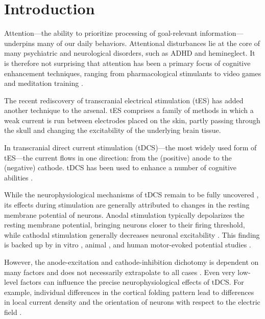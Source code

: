 \documentclass[11pt,english,]{memoir}
\begin{document}
\hypertarget{tDCS_att_review-introduction}{%
\section{Introduction}\label{tDCS_att_review-introduction}}

Attention---the ability to prioritize processing of goal-relevant information---underpins many of our daily behaviors. Attentional disturbances lie at the core of many psychiatric and neurological disorders, such as ADHD and hemineglect. It is therefore not surprising that attention has been a primary focus of cognitive enhancement techniques, ranging from pharmacological stimulants \autocite{Koelega1993} to video games \autocite{Green2012} and meditation training \autocite{Lutz2008}.

The recent rediscovery of transcranial electrical stimulation (tES) has added another technique to the arsenal. tES comprises a family of methods in which a weak current is run between electrodes placed on the skin, partly passing through the skull and changing the excitability of the underlying brain tissue.

In transcranial direct current stimulation (tDCS)---the most widely used form of tES---the current flows in one direction: from the (positive) anode to the (negative) cathode. tDCS has been used to enhance a number of cognitive abilities \autocites{Coffman2014}{CohenKadosh2014}{Mancuso2016}[but see][]{Horvath2015}.

While the neurophysiological mechanisms of tDCS remain to be fully uncovered \autocites[for reviews, see][]{Stagg2011b}{Medeiros2012}, its effects during stimulation are generally attributed to changes in the resting membrane potential of neurons. Anodal stimulation typically depolarizes the resting membrane potential, bringing neurons closer to their firing threshold, while cathodal stimulation generally decreases neuronal excitability \autocite{Nitsche2008}. This finding is backed up by in vitro \autocite{Terzuolo1956}, animal \autocite{Bindman1964}, and human motor-evoked potential studies \autocites{Nitsche2000}{Nitsche2001}.

However, the anode-excitation and cathode-inhibition dichotomy is dependent on many factors and does not necessarily extrapolate to all cases \autocites{Bestmann2014}{Jacobson2012}{Parkin2015}. Even very low-level factors can influence the precise neurophysiological effects of tDCS. For example, individual differences in the cortical folding pattern lead to differences in local current density \autocite{Opitz2015} and the orientation of neurons with respect to the electric field \autocite{Radman2009}.
\end{document}
